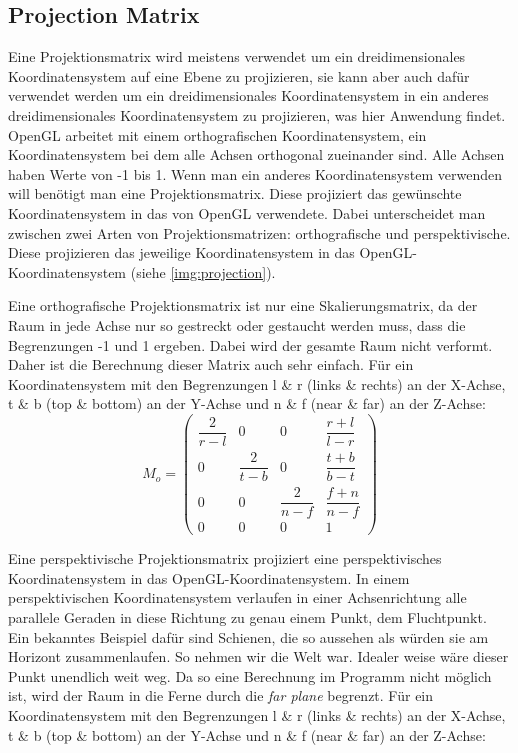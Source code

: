 \subsection{Projection Matrix}
\label{Sec:Projection}

Eine Projektionsmatrix wird meistens verwendet um ein dreidimensionales Koordinatensystem auf eine Ebene zu projizieren, sie kann aber auch dafür verwendet werden um ein dreidimensionales Koordinatensystem in ein anderes dreidimensionales Koordinatensystem zu projizieren, was hier Anwendung findet. OpenGL arbeitet mit einem orthografischen Koordinatensystem, ein Koordinatensystem bei dem alle Achsen orthogonal zueinander sind. Alle Achsen haben Werte von -1 bis 1. Wenn man ein anderes Koordinatensystem verwenden will benötigt man eine Projektionsmatrix. Diese projiziert das gewünschte Koordinatensystem in das von OpenGL verwendete. Dabei unterscheidet man zwischen zwei Arten von Projektionsmatrizen: orthografische und perspektivische. Diese projizieren das jeweilige Koordinatensystem in das OpenGL-Koordinatensystem (siehe \cref{img:projection}).

Eine orthografische Projektionsmatrix ist nur eine Skalierungsmatrix, da der Raum in jede Achse nur so gestreckt oder gestaucht werden muss, dass die Begrenzungen -1 und 1 ergeben. Dabei wird der gesamte Raum nicht verformt. Daher ist die Berechnung dieser Matrix auch sehr einfach. Für ein Koordinatensystem mit den Begrenzungen l \& r (links \& rechts) an der X-Achse, t \& b (top \& bottom) an der Y-Achse und n \& f (near \& far) an der Z-Achse:
$$ M_{o} = \begin{pmatrix}
\dfrac{2}{r-l} & 0 & 0 & \dfrac{r+l}{l-r} \\
0 & \dfrac{2}{t-b} & 0 & \dfrac{t+b}{b-t} \\
0 & 0 & \dfrac{2}{n-f} & \dfrac{f+n}{n-f} \\
0 & 0 & 0 & 1
\end{pmatrix} $$

Eine perspektivische Projektionsmatrix projiziert eine perspektivisches Koordinatensystem in das OpenGL-Koordinatensystem. In einem perspektivischen Koordinatensystem verlaufen in einer Achsenrichtung alle parallele Geraden in diese Richtung zu genau einem Punkt, dem Fluchtpunkt. Ein bekanntes Beispiel dafür sind Schienen, die so aussehen als würden sie am Horizont zusammenlaufen. So nehmen wir die Welt war. Idealer weise wäre dieser Punkt unendlich weit weg. Da so eine Berechnung im Programm nicht möglich ist, wird der Raum in die Ferne durch die \textit{far plane} begrenzt.
Für ein Koordinatensystem mit den Begrenzungen l \& r (links \& rechts) an der X-Achse, t \& b (top \& bottom) an der Y-Achse und n \& f (near \& far) an der Z-Achse:

